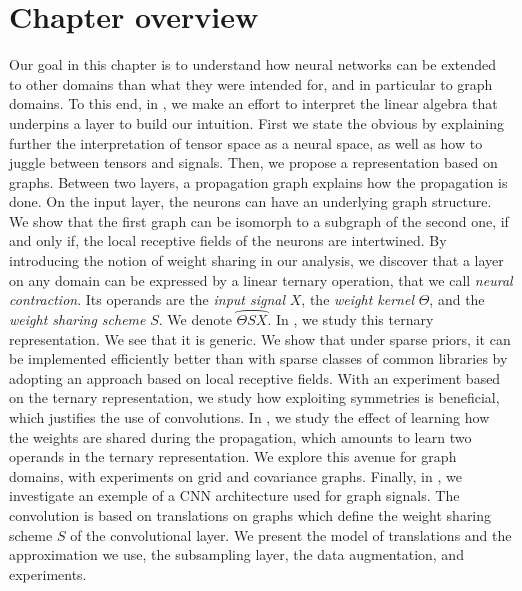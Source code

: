 \section*{Chapter overview}

Our goal in this chapter is to understand how neural networks can be extended to other domains than what they were intended for, and in particular to graph domains. To this end, in , we make an effort to interpret the linear algebra that underpins a layer to build our intuition. First we state the obvious by explaining further the interpretation of tensor space as a neural space, as well as how to juggle between tensors and signals. Then, we propose a representation based on graphs. Between two layers, a propagation graph explains how the propagation is done. On the input layer, the neurons can have an underlying graph structure. We show that the first graph can be isomorph to a subgraph of the second one, if and only if, the local receptive fields of the neurons are intertwined. By introducing the notion of weight sharing in our analysis, we discover that a layer on any domain can be expressed by a linear ternary operation, that we call \emph{neural contraction}. Its operands are the \emph{input signal} $X$, the \emph{weight kernel} $\Theta$, and the \emph{weight sharing scheme} $S$. We denote $\wideparen{\Theta S X}$. In , we study this ternary representation. We see that it is generic. We show that under sparse priors, it can be implemented efficiently better than with sparse classes of common libraries by adopting an approach based on local receptive fields. With an experiment based on the ternary representation, we study how exploiting symmetries is beneficial, which justifies the use of convolutions. In , we study the effect of learning how the weights are shared during the propagation, which amounts to learn two operands in the ternary representation. We explore this avenue for graph domains, with experiments on grid and covariance graphs. Finally, in , we investigate an exemple of a CNN architecture used for graph signals. The convolution is based on translations on graphs which define the weight sharing scheme $S$ of the convolutional layer. We present the model of translations and the approximation we use, the subsampling layer, the data augmentation, and experiments.
